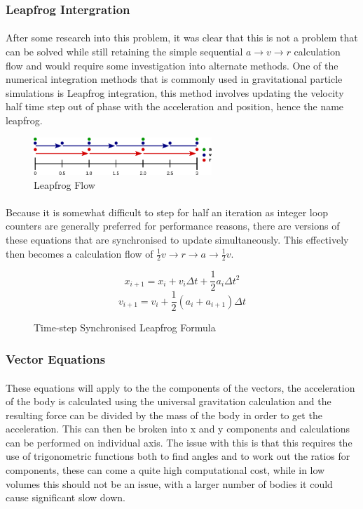 \subsubsection{Leapfrog Intergration}
\paragraph{}
After some research into this problem, it was clear that this is not a problem that can be solved while still retaining the simple sequential $a \rightarrow v \rightarrow r$ calculation flow and would require some investigation into alternate methods. One of the numerical integration methods that is commonly used in gravitational particle simulations is Leapfrog integration, this method involves updating the velocity half time step out of phase with the acceleration and position, hence the name leapfrog.

\begin{figure}[!ht]
  \centering
  \includegraphics[width=0.6\textwidth]{img/leapfrog.png}
  \caption{Leapfrog Flow}
\end{figure}

\paragraph{}
Because it is somewhat difficult to step for half an iteration as integer loop counters are generally preferred for performance reasons, there are versions of these equations that are synchronised to update simultaneously. This effectively then becomes a calculation flow of $\frac{1}{2}v \rightarrow r \rightarrow a \rightarrow \frac{1}{2}v$.

\begin{figure}[!ht]
  $$x_{i+1}=x_i+v_i\Delta{t}+\frac{1}{2}a_i\Delta{t}^2$$
  $$v_{i+1}=v_i+\frac{1}{2}(a_i+a_{i+1})\Delta{t}$$
  \caption{Time-step Synchronised Leapfrog Formula}
\end{figure}

\subsubsection{Vector Equations}
\paragraph{}
These equations will apply to the the components of the vectors, the acceleration of the body is calculated using the universal gravitation calculation and the resulting force can be divided by the mass of the body in order to get the acceleration. This can then be broken into x and y components and calculations can be performed on individual axis. The issue with this is that this requires the use of trigonometric functions both to find angles and to work out the ratios for components, these can come a quite high computational cost, while in low volumes this should not be an issue, with a larger number of bodies it could cause significant slow down.

